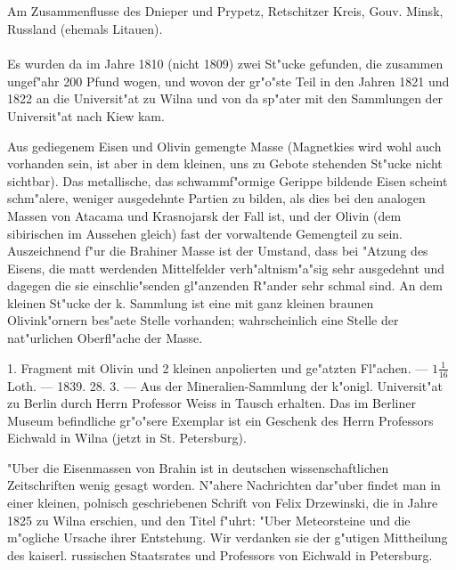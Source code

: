 \documentclass[a4paper, 11pt, oneside, polutonikogreek, german]{article}
\begin{document}
\subsection{}
\begin{center}

Am Zusammenflusse des Dnieper und Prypetz, Retschitzer Kreis, Gouv. Minsk, Russland (ehemals Litauen).
\end{center}
\paragraph{}
Es wurden da im Jahre 1810 (nicht 1809) zwei St"ucke gefunden, die zusammen ungef"ahr 200 Pfund wogen, und wovon der gr"o"ste Teil in den Jahren 1821 und 1822 an die Universit"at zu Wilna und von da sp"ater mit den Sammlungen der Universit"at nach Kiew kam.

Aus gediegenem Eisen und Olivin gemengte Masse (Magnetkies wird wohl auch vorhanden sein, ist aber in dem kleinen, uns zu Gebote stehenden St"ucke nicht sichtbar). Das metallische, das schwammf"ormige Gerippe bildende Eisen scheint schm"alere, weniger ausgedehnte Partien zu bilden, als dies bei den analogen Massen von Atacama und Krasnojarsk der Fall ist, und der Olivin (dem sibirischen im Aussehen gleich) fast der vorwaltende Gemengteil zu sein. Auszeichnend f"ur die Brahiner Masse ist der Umstand, dass bei "Atzung des Eisens, die matt werdenden Mittelfelder verh"altnism"a"sig sehr ausgedehnt und dagegen die sie einschlie"senden gl"anzenden R"ander sehr schmal sind. An dem kleinen St"ucke der k. Sammlung ist eine mit ganz kleinen braunen Olivink"ornern bes"aete Stelle vorhanden; wahrscheinlich eine Stelle der nat"urlichen Oberfl"ache der Masse.

1. Fragment mit Olivin und 2 kleinen anpolierten und ge"atzten Fl"achen. --- $\mathfrak{1\frac{1}{16}}$ Loth. --- 1839. 28. 3. --- Aus der Mineralien-Sammlung der k"onigl. Universit"at zu Berlin durch Herrn Professor Weiss in Tausch erhalten. Das im Berliner Museum befindliche gr"o"sere Exemplar ist ein Geschenk des Herrn Professors Eichwald in Wilna (jetzt in St. Petersburg).

\setlength{\leftskip}{10mm}
\setlength{\parindent}{0pt}

{\footnotesize "Uber die Eisenmassen von Brahin ist in deutschen wissenschaftlichen Zeitschriften wenig gesagt worden. N"ahere Nachrichten dar"uber findet man in einer kleinen, polnisch geschriebenen Schrift von Felix Drzewinski, die in Jahre 1825 zu Wilna erschien, und den Titel f"uhrt: "Uber Meteorsteine und die m"ogliche Ursache ihrer Entstehung. Wir verdanken sie der g"utigen Mittheilung des kaiserl. russischen Staatsrates und Professors von Eichwald in Petersburg.}
\end{document}
